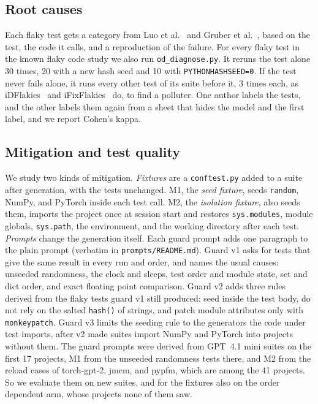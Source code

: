 \subsection{Root causes}
Each flaky test gets a category from Luo et al.~\cite{luo2014} and Gruber et al.~\cite{gruber2021}, based on the test, the code it calls, and a reproduction of the failure. For every flaky test in the known flaky code study we also run \texttt{od\_diagnose.py}. It reruns the test alone 30 times, 20 with a new hash seed and 10 with \texttt{PYTHONHASHSEED=0}. If the test never fails alone, it runs every other test of its suite before it, 3 times each, as iDFlakies~\cite{lam2019} and iFixFlakies~\cite{shi2019} do, to find a polluter. One author labels the tests, and the other labels them again from a sheet that hides the model and the first label, and we report Cohen's kappa.

\subsection{Mitigation and test quality}
\label{sec:mitig}
We study two kinds of mitigation. \emph{Fixtures} are a \texttt{conftest.py} added to a suite after generation, with the tests unchanged. M1, the \emph{seed fixture}, seeds \texttt{random}, NumPy, and PyTorch inside each test call. M2, the \emph{isolation fixture}, also seeds them, imports the project once at session start and restores \texttt{sys.modules}, module globals, \texttt{sys.path}, the environment, and the working directory after each test. \emph{Prompts} change the generation itself. Each guard prompt adds one paragraph to the plain prompt (verbatim in \texttt{prompts/README.md}). Guard v1 asks for tests that give the same result in every run and order, and names the usual causes: unseeded randomness, the clock and sleeps, test order and module state, set and dict order, and exact floating point comparison. Guard v2 adds three rules derived from the flaky tests guard v1 still produced: seed inside the test body, do not rely on the salted \texttt{hash()} of strings, and patch module attributes only with \texttt{monkeypatch}. Guard v3 limits the seeding rule to the generators the code under test imports, after v2 made suites import NumPy and PyTorch into projects without them. The guard prompts were derived from GPT~4.1 mini suites on the first 17 projects, M1 from the unseeded randomness tests there, and M2 from the reload cases of torch-gpt-2, jmcm, and pypfm, which are among the 41 projects. So we evaluate them on new suites, and for the fixtures also on the order dependent arm, whose projects none of them saw.

